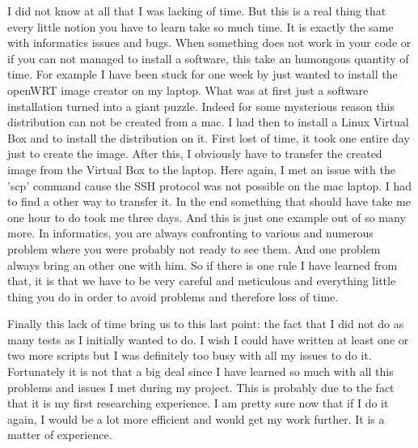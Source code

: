 \par 
I did not know at all that I was lacking of time. But this is a real thing that every little notion you have to learn take so much time. It is exactly the same with informatics issues and bugs. When something does not work in your code or if you can not managed to install a software, this take an humongous quantity of time. For example I have been stuck for one week by just wanted to install the openWRT image creator on my laptop. What was at first just a software installation turned into a giant puzzle. Indeed for some mysterious reason this distribution can not be created from a mac. I had then to install a Linux Virtual Box and to install the distribution on it. First lost of time, it took one entire day just to create the image. After this, I obviously have to transfer the created image from the Virtual Box to the laptop. Here again, I met an issue with the 'scp' command cause the SSH protocol was not possible on the mac laptop. I had to find a other way to transfer it. In the end something that should have take me one hour to do took me three days. And this is just one example out of so many more. In informatics, you are always confronting to various and numerous problem where you were probably not ready to see them. And one problem always bring an other one with him. So if there is one rule I have learned from that, it is that we have to be very careful and meticulous and everything little thing you do in order to avoid problems and therefore loss of time. 

\par
Finally this lack of time bring us to this last point: the fact that I did not do as many tests as I initially wanted to do. I wish I could have written at least one or two more scripts but I was definitely too busy with all my issues to do it. Fortunately it is not that a big deal since I have learned so much with all this problems and issues I met during my project. This is probably due to the fact that it is my first researching experience. I am pretty sure now that if I do it again, I would be a lot more efficient and would get my work further. It is a matter of experience. 